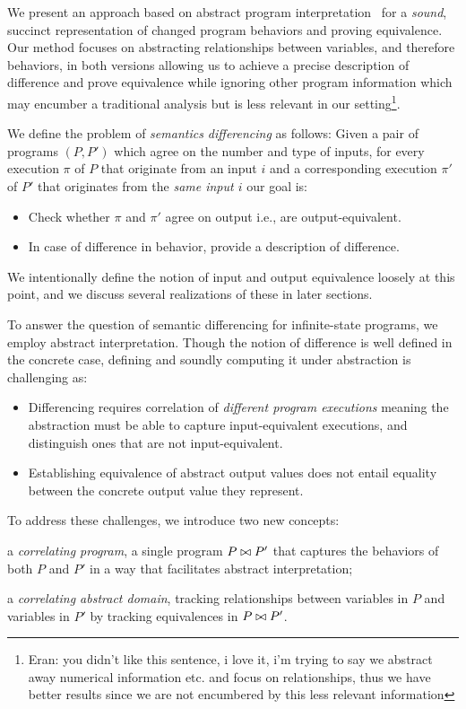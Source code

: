 We present an approach based on abstract program interpretation~\cite{CousotCousot77} for a \emph{sound}, succinct representation of changed program behaviors and proving equivalence. Our method focuses on abstracting relationships between variables, and therefore behaviors, in both versions allowing us to achieve a precise description of difference and prove equivalence while ignoring other program information which may encumber a traditional analysis but is less relevant in our setting\footnote[1]{Eran: you didn't like this sentence, i love it, i'm trying to say we abstract away numerical information etc. and focus on relationships, thus we have better results since we are not encumbered by this less relevant information}.

We define the problem of \emph{semantics differencing} as follows: Given a pair of programs $(P,P')$ which agree on the number and type of inputs, for every execution $\pi$ of $P$ that originate from an input $i$ and a corresponding execution $\pi'$ of $P'$ that originates from the \emph{same input $i$} our goal is:
\begin{itemize}
\item Check whether $\pi$ and $\pi'$ agree on output i.e., are output-equivalent.
\item In case of difference in behavior, provide a description of difference.
\end{itemize}
We intentionally define the notion of input and output equivalence loosely at this point, and we discuss several realizations of these in later sections.

To answer the question of semantic differencing for infinite-state programs, we employ abstract interpretation. Though the notion of difference is well defined in the concrete case, defining and soundly computing it under abstraction is challenging as:
\begin{itemize}
\item Differencing requires correlation of \emph{different program executions} meaning the abstraction must be able to capture input-equivalent executions, and distinguish ones that are not input-equivalent.
\item Establishing equivalence of abstract output values does not entail equality between the concrete output value they represent.
\end{itemize}

To address these challenges, we introduce two new concepts:
\begin{inparaenum}[(i)]
\item a \emph{correlating program}, a single program $P \bowtie P'$ that captures the behaviors of both $P$ and $P'$ in a way that facilitates abstract interpretation;
\item a \emph{correlating abstract domain}, tracking relationships between variables in $P$ and variables in $P'$ by tracking equivalences in $P \bowtie P'$.
\end{inparaenum}

